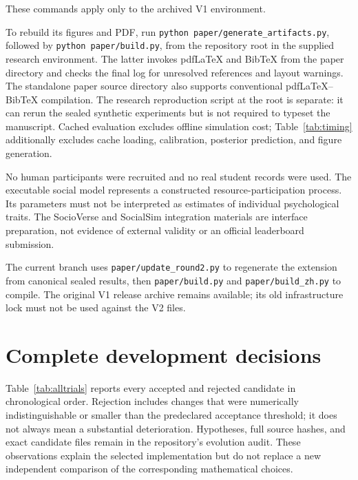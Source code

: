 \documentclass[10pt]{article}
\begin{document}
These commands apply only to the archived V1 environment.

To rebuild its figures and PDF, run \texttt{python paper/generate\_artifacts.py}, followed by \texttt{python paper/build.py}, from the repository root in the supplied research environment. The latter invokes pdfLaTeX and BibTeX from the paper directory and checks the final log for unresolved references and layout warnings. The standalone paper source directory also supports conventional pdfLaTeX--BibTeX compilation. The research reproduction script at the root is separate: it can rerun the sealed synthetic experiments but is not required to typeset the manuscript. Cached evaluation excludes offline simulation cost; Table~\ref{tab:timing} additionally excludes cache loading, calibration, posterior prediction, and figure generation.

No human participants were recruited and no real student records were used. The executable social model represents a constructed resource-participation process. Its parameters must not be interpreted as estimates of individual psychological traits. The SocioVerse and SocialSim integration materials are interface preparation, not evidence of external validity or an official leaderboard submission.

The current branch uses \texttt{paper/update\_round2.py} to regenerate the extension from canonical sealed results, then \texttt{paper/build.py} and \texttt{paper/build\_zh.py} to compile. The original V1 release archive remains available; its old infrastructure lock must not be used against the V2 files.

\section{Complete development decisions}
\label{app:trials}
Table~\ref{tab:alltrials} reports every accepted and rejected candidate in chronological order. Rejection includes changes that were numerically indistinguishable or smaller than the predeclared acceptance threshold; it does not always mean a substantial deterioration. Hypotheses, full source hashes, and exact candidate files remain in the repository's evolution audit. These observations explain the selected implementation but do not replace a new independent comparison of the corresponding mathematical choices.
\footnotesize

\end{document}
